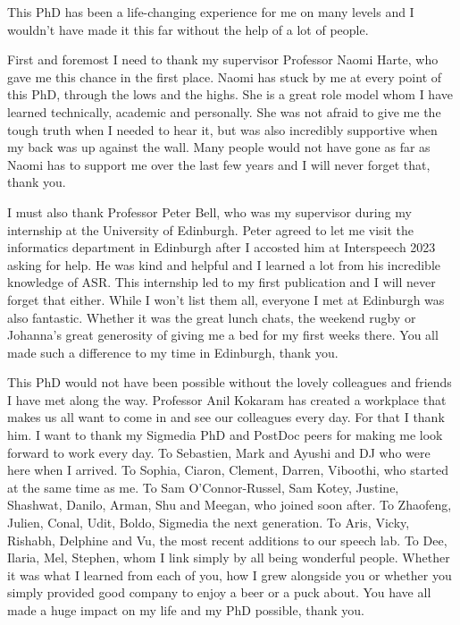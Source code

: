 This PhD has been a life-changing experience for me on many levels and I wouldn't have made it this far without the help of a lot of people.

First and foremost I need to thank my supervisor Professor Naomi Harte, who gave me this chance in the first place. Naomi has stuck by me at every point of this PhD, through the lows and the highs. She is a great role model whom I have learned technically, academic and personally. She was not afraid to give me the tough truth when I needed to hear it, but was also incredibly supportive when my back was up against the wall. Many people would not have gone as far as Naomi has to support me over the last few years and I will never forget that, thank you.

I must also thank Professor Peter Bell, who was my supervisor during my internship at the University of Edinburgh. Peter agreed to let me visit the informatics department in Edinburgh after I accosted him at Interspeech 2023 asking for help. He was kind and helpful and I learned a lot from his incredible knowledge of ASR. This internship led to my first publication and I will never forget that either. While I won't list them all, everyone I met at Edinburgh was also fantastic. Whether it was the great lunch chats, the weekend rugby or Johanna's great generosity of giving me a bed for my first weeks there. You all made such a difference to my time in Edinburgh, thank you.

This PhD would not have been possible without the lovely colleagues and friends I have met along the way. Professor Anil Kokaram has created a workplace that makes us all want to come in and see our colleagues every day. For that I thank him. I want to thank my Sigmedia PhD and PostDoc peers for making me look forward to work every day. To Sebastien, Mark and Ayushi and DJ who were here when I arrived. To Sophia, Ciaron, Clement, Darren, Viboothi, who started at the same time as me. To Sam O'Connor-Russel, Sam Kotey, Justine, Shashwat, Danilo, Arman, Shu and Meegan, who joined soon after. To Zhaofeng, Julien, Conal, Udit, Boldo, Sigmedia the next generation. To Aris, Vicky, Rishabh, Delphine and Vu, the most recent additions to our speech lab. To Dee, Ilaria, Mel, Stephen, whom I link simply by all being wonderful people. Whether it was what I learned from each of you, how I grew alongside you or whether you simply provided good company to enjoy a beer or a puck about. You have all made a huge impact on my life and my PhD possible, thank you. 

